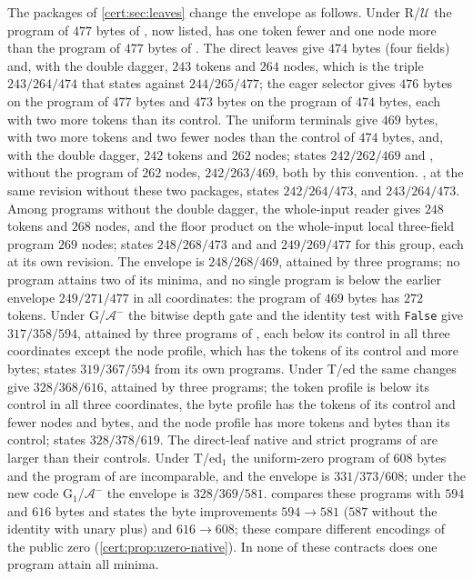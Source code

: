 The packages of \cref{cert:sec:leaves} change the envelope as follows. Under
R/$\mathcal U$ the program of $477$ bytes of , now
listed, has one token fewer and one node more than the program of $477$ bytes
of . The direct leaves give $474$ bytes (four fields)
and, with the double dagger, $243$ tokens and $264$ nodes, which is the triple
$243/264/474$ that  states against $244/265/477$; the
eager selector gives $476$ bytes on the program of $477$ bytes and $473$ bytes
on the program of $474$ bytes, each with two more tokens than its control. The
uniform terminals give $469$ bytes, with two more tokens and two fewer nodes
than the control of $474$ bytes, and, with the double dagger, $242$ tokens and
$262$ nodes;  states $242/262/469$ and
, without the program of $262$ nodes, $242/263/469$,
both by this convention. , at the same revision
without these two packages, states $242/264/473$, and
 $243/264/473$. Among programs without the double
dagger, the whole-input reader gives $248$ tokens and $268$ nodes, and the
floor product on the whole-input local three-field program $269$ nodes;
 states $248/268/473$ and
 and 
$249/269/477$ for this group, each at its own revision. The envelope is
$248/268/469$, attained by three programs; no program attains two of its
minima, and no single program is below the earlier envelope $249/271/477$ in
all coordinates: the program of $469$ bytes has $272$ tokens. Under
G/$\mathcal A^{-}$ the bitwise depth gate and the identity test with
\texttt{False} give $317/358/594$, attained by three programs of
, each below its control in all three
coordinates except the node profile, which has the tokens of its control and
more bytes;  states $319/367/594$ from its own
programs. Under T/ed the same changes give $328/368/616$, attained by three
programs; the token profile is below its control in all three coordinates, the
byte profile has the tokens of its control and fewer nodes and bytes, and the
node profile has more tokens and bytes than its control;  states $328/378/619$. The direct-leaf
native and strict programs of  are larger than their
controls. Under T/ed$_1$ the uniform-zero program of $608$ bytes and the
program of  are incomparable, and the envelope is
$331/373/608$; under the new code G$_1$/$\mathcal A^{-}$ the envelope is
$328/369/581$.  compares these programs with
$594$ and $616$ bytes and states the byte improvements $594\to 581$ ($587$
without the identity with unary plus) and $616\to 608$; these compare
different encodings of the public zero (\cref{cert:prop:uzero-native}). In none
of these contracts does one program attain all minima.

